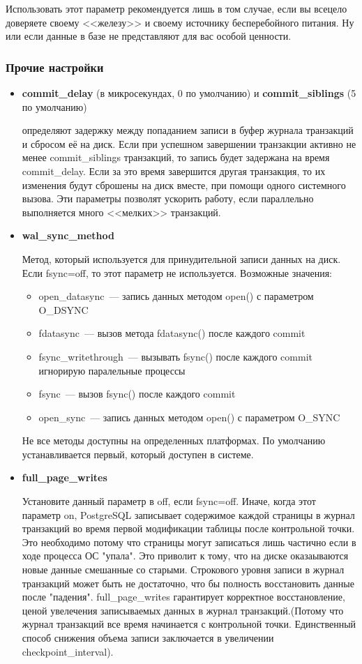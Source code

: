 Использовать этот параметр рекомендуется лишь в том случае, если вы всецело доверяете своему <<железу>> и своему источнику 
бесперебойного питания. Ну или если данные в базе не представляют для вас особой ценности.

\subsubsection{Прочие настройки}
\begin{itemize}
\item 
\textbf{commit\_delay} (в микросекундах, 0 по умолчанию) и \textbf{commit\_sib\-lings} (5 по умолчанию) 

определяют задержку между попаданием записи в буфер журнала транзакций и сбросом её на диск. 
Если при успешном завершении транзакции активно не менее commit\_siblings транзакций, то запись будет задержана на время 
commit\_delay. Если за это время завершится другая транзакция, то их изменения будут сброшены на диск вместе, при помощи 
одного системного вызова. Эти параметры позволят ускорить работу, если параллельно выполняется много <<мелких>> транзакций.

\item \textbf{wal\_sync\_method}

Метод, который используется для принудительной записи данных на диск.
Если fsync=off, то этот параметр не используется.
Возможные значения:
\begin{itemize}
\item open\_datasync~--- запись данных методом open() с параметром O\_DSYNC
\item fdatasync~--- вызов метода fdatasync() после каждого commit
\item fsync\_writethrough~--- вызывать fsync() после каждого commit игнорирую паралельные процессы
\item fsync~--- вызов fsync() после каждого commit
\item open\_sync~--- запись данных методом open() с параметром O\_SYNC
\end{itemize}

Не все методы доступны на определенных платформах. По умолчанию устанавливается первый, который доступен в системе.

\item \textbf{full\_page\_writes}

Установите данный параметр в off, если fsync=off. Иначе, когда этот параметр on, PostgreSQL записывает содержимое 
каждой страницы в журнал транзакций во время первой модификации таблицы после контрольной точки. Это необходимо потому 
что страницы могут записаться лишь частично если в ходе процесса ОС "упала". Это приволит к тому, что на диске оказаываются 
новые данные смешанные со старыми. Строкового уровня записи в журнал транзакций может быть не достаточно, что бы полность 
восстановить данные после "падения". full\_page\_writes гарантирует корректное восстановление, ценой увелечения записываемых 
данных в журнал транзакций.(Потому что журнал транзакций все время начинается с контрольной точки. Единственный способ 
снижения объема записи заключается в увеличении checkpoint\_interval).


\end{itemize}
